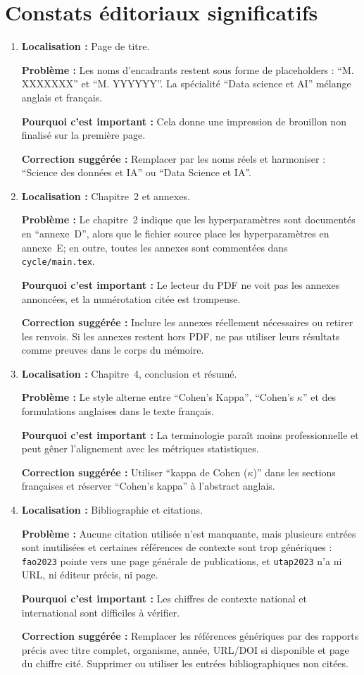 \documentclass[11pt,a4paper]{article}
\newcommand{\loc}[1]{\textbf{Localisation :} #1\par}
\newcommand{\prob}[1]{\textbf{Problème :} #1\par}
\newcommand{\impact}[1]{\textbf{Pourquoi c'est important :} #1\par}
\newcommand{\fix}[1]{\textbf{Correction suggérée :} #1\par}
\begin{document}
\section*{Constats éditoriaux significatifs}

\begin{enumerate}
  \item \loc{Page de titre.}
  \prob{Les noms d'encadrants restent sous forme de placeholders : \enquote{M. XXXXXXX} et \enquote{M. YYYYYY}. La spécialité \enquote{Data science et AI} mélange anglais et français.}
  \impact{Cela donne une impression de brouillon non finalisé sur la première page.}
  \fix{Remplacer par les noms réels et harmoniser : \enquote{Science des données et IA} ou \enquote{Data Science et IA}.}

  \item \loc{Chapitre~2 et annexes.}
  \prob{Le chapitre~2 indique que les hyperparamètres sont documentés en \enquote{annexe~D}, alors que le fichier source place les hyperparamètres en annexe~E; en outre, toutes les annexes sont commentées dans \texttt{cycle/main.tex}.}
  \impact{Le lecteur du PDF ne voit pas les annexes annoncées, et la numérotation citée est trompeuse.}
  \fix{Inclure les annexes réellement nécessaires ou retirer les renvois. Si les annexes restent hors PDF, ne pas utiliser leurs résultats comme preuves dans le corps du mémoire.}

  \item \loc{Chapitre~4, conclusion et résumé.}
  \prob{Le style alterne entre \enquote{Cohen's Kappa}, \enquote{Cohen's \(\kappa\)} et des formulations anglaises dans le texte français.}
  \impact{La terminologie paraît moins professionnelle et peut gêner l'alignement avec les métriques statistiques.}
  \fix{Utiliser \enquote{kappa de Cohen (\(\kappa\))} dans les sections françaises et réserver \enquote{Cohen's kappa} à l'abstract anglais.}

  \item \loc{Bibliographie et citations.}
  \prob{Aucune citation utilisée n'est manquante, mais plusieurs entrées sont inutilisées et certaines références de contexte sont trop génériques : \texttt{fao2023} pointe vers une page générale de publications, et \texttt{utap2023} n'a ni URL, ni éditeur précis, ni page.}
  \impact{Les chiffres de contexte national et international sont difficiles à vérifier.}
  \fix{Remplacer les références génériques par des rapports précis avec titre complet, organisme, année, URL/DOI si disponible et page du chiffre cité. Supprimer ou utiliser les entrées bibliographiques non citées.}
\end{enumerate}
\end{document}
